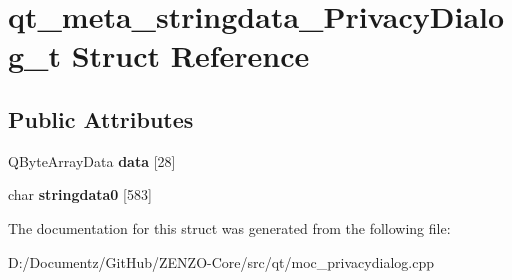 \hypertarget{structqt__meta__stringdata___privacy_dialog__t}{}\section{qt\+\_\+meta\+\_\+stringdata\+\_\+\+Privacy\+Dialog\+\_\+t Struct Reference}
\label{structqt__meta__stringdata___privacy_dialog__t}
\subsection*{Public Attributes}
\begin{DoxyCompactItemize}
\item 
\mbox{\label{structqt__meta__stringdata___privacy_dialog__t_ae1a4048ceb90c101402343b4181949e5}} 
Q\+Byte\+Array\+Data {\bfseries data} \mbox{[}28\mbox{]}
\item 
\mbox{\label{structqt__meta__stringdata___privacy_dialog__t_ae997aa05ab2f9e5a19bf184bb58cba21}} 
char {\bfseries stringdata0} \mbox{[}583\mbox{]}
\end{DoxyCompactItemize}


The documentation for this struct was generated from the following file\+:\begin{DoxyCompactItemize}
\item 
D\+:/\+Documentz/\+Git\+Hub/\+Z\+E\+N\+Z\+O-\/\+Core/src/qt/moc\+\_\+privacydialog.\+cpp\end{DoxyCompactItemize}

